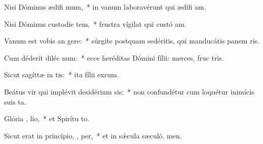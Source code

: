 \item Nisi Dóminus ædifi mum,~* in vanum laboravérunt qui ædífi am.
\item Nisi Dóminus custodíe tem,~* frustra vígilat qui custó am.
\item Vanum est vobis an  gere:~* súrgite postquam sedéritis, qui manducátis panem ris.
\item Cum déderit diléc  num:~* ecce heréditas Dómini fílii: merces, fruc tris.
\item Sicut sagíttæ in  tis:~* ita fílii exrum.
\item Beátus vir qui implévit desidérium   sis:~* non confundétur cum loquétur inimícis suis  ta.
\item Glória ,  lio,~* et Spirítu to.
\item Sicut erat in princípio,  ,  per,~* et in sǽcula sæculó. men.
